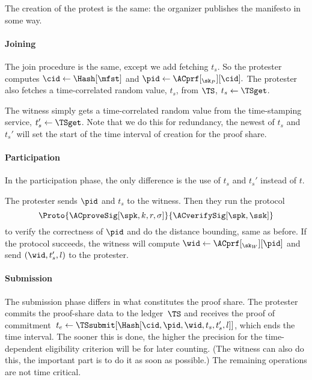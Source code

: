The creation of the protest is the same: the organizer publishes the manifesto 
in some way.

\paragraph*{Joining}

The join procedure is the same, except we add fetching \(t_s\).
So the protester computes \(
  \cid\gets \Hash[\mfst]
\) and \(
  \pid\gets \ACprf[_{\sk_P}][\cid].
\) The protester also fetches a time-correlated random value, \(t_s\), from 
\(\TS\), \(t_s\gets \TSget\).

The witness simply gets a time-correlated random value from the time-stamping 
service, \(t_s'\gets \TSget\).
Note that we do this for redundancy, the newest of \(t_s\) and \(t_s'\) will 
set the start of the time interval of creation for the proof share.


\paragraph*{Participation}

In the participation phase, the only difference is the use of \(t_s\) and 
\(t_s'\) instead of \(t\).

The protester sends \(\pid\) and \(t_s\) to the witness.
Then they run the protocol \[
  \Proto{\ACproveSig[\spk, k, r, \sigma]}{\ACverifySig[\spk, \ssk]}
\] to verify the correctness of \(\pid\) and do the distance bounding, same as 
before.
If the protocol succeeds, the witness will compute \(\wid \gets 
\ACprf[_{\sk_W}][\pid]\) and send \((\wid, t_s', l)\) to the protester.


\paragraph*{Submission}

The submission phase differs in what constitutes the proof share.
The protester commits the proof-share data to the ledger~\(\TS\) and receives 
the proof of commitment~\(t_e\gets \TSsubmit[\Hash[\cid, \pid, \wid, t_s, t_s', 
l]]\), which ends the time interval.
The sooner this is done, the higher the precision for the time-dependent 
eligibility criterion will be for later counting.
(The witness can also do this, the important part is to do it as soon as 
possible.)
The remaining operations are not time critical.

